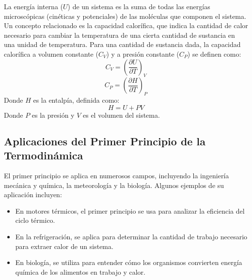 \documentclass[../main]{subfiles}
\begin{document}
La energía interna ($U$) de un sistema es la suma de todas las energías microscópicas (cinéticas y potenciales) de las moléculas que componen el sistema. Un concepto relacionado es la capacidad calorífica, que indica la cantidad de calor necesario para cambiar la temperatura de una cierta cantidad de sustancia en una unidad de temperatura. Para una cantidad de sustancia dada, la capacidad calorífica a volumen constante ($C_V$) y a presión constante ($C_P$) se definen como:
\begin{equation}
C_V = \left( \frac{\partial U}{\partial T} \right)_V
\end{equation}
\begin{equation}
C_P = \left( \frac{\partial H}{\partial T} \right)_P
\end{equation}
Donde $H$ es la entalpía, definida como:
\begin{equation}
H = U + PV
\end{equation}
Donde $P$ es la presión y $V$ es el volumen del sistema.

\subsection{Aplicaciones del Primer Principio de la Termodinámica}

El primer principio se aplica en numerosos campos, incluyendo la ingeniería mecánica y química, la meteorología y la biología. Algunos ejemplos de su aplicación incluyen:

\begin{itemize}
    \item En motores térmicos, el primer principio se usa para analizar la eficiencia del ciclo térmico.
    \item En la refrigeración, se aplica para determinar la cantidad de trabajo necesario para extraer calor de un sistema.
    \item En biología, se utiliza para entender cómo los organismos convierten energía química de los alimentos en trabajo y calor.
\end{itemize}
\end{document}
